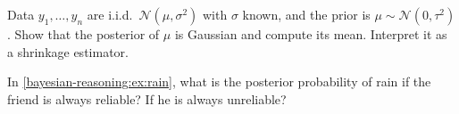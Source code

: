 \begin{notechapter}
\begin{exercise}\label{bayesian-reasoning:exr:3}
Data $y_1,\dots,y_n$ are i.i.d.\ $\mathcal N(\mu,\sigma^2)$ with $\sigma$ known, and
the prior is $\mu\sim\mathcal N(0,\tau^2)$. Show that the posterior of $\mu$ is
Gaussian and compute its mean. Interpret it as a shrinkage estimator.
\end{exercise}

\begin{exercise}\label{bayesian-reasoning:exr:4}
In \cref{bayesian-reasoning:ex:rain}, what is the posterior probability of rain
if the friend is always reliable? If he is always unreliable?
\end{exercise}
\end{notechapter}
